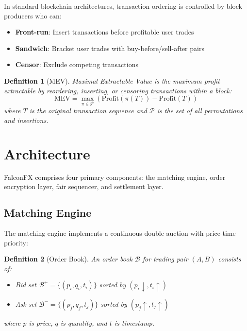 \documentclass[11pt,a4paper]{article}
\newtheorem{definition}{Definition}
\begin{document}
In standard blockchain architectures, transaction ordering is controlled by block producers who can:

\begin{itemize}
    \item \textbf{Front-run}: Insert transactions before profitable user trades
    \item \textbf{Sandwich}: Bracket user trades with buy-before/sell-after pairs
    \item \textbf{Censor}: Exclude competing transactions
\end{itemize}

\begin{definition}[MEV]
Maximal Extractable Value is the maximum profit extractable by reordering, inserting, or censoring transactions within a block:
\begin{equation}
    \text{MEV} = \max_{\pi \in \mathcal{P}} \left( \text{Profit}(\pi(T)) - \text{Profit}(T) \right)
\end{equation}
where $T$ is the original transaction sequence and $\mathcal{P}$ is the set of all permutations and insertions.
\end{definition}

\section{Architecture}

FalconFX comprises four primary components: the matching engine, order encryption layer, fair sequencer, and settlement layer.

\subsection{Matching Engine}

The matching engine implements a continuous double auction with price-time priority:

\begin{definition}[Order Book]
An order book $\mathcal{B}$ for trading pair $(A, B)$ consists of:
\begin{itemize}
    \item Bid set $\mathcal{B}^+ = \{(p_i, q_i, t_i)\}$ sorted by $(p_i \downarrow, t_i \uparrow)$
    \item Ask set $\mathcal{B}^- = \{(p_j, q_j, t_j)\}$ sorted by $(p_j \uparrow, t_j \uparrow)$
\end{itemize}
where $p$ is price, $q$ is quantity, and $t$ is timestamp.
\end{definition}
\end{document}
